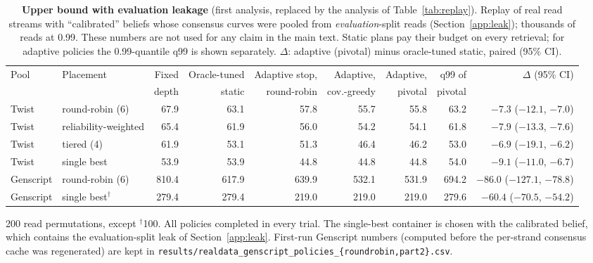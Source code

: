 \begin{table}[!t]
\centering
\caption{\textbf{Upper bound with evaluation leakage} (first analysis, replaced by the analysis of Table~\ref{tab:replay}).  Replay of real read streams with ``calibrated'' beliefs whose consensus curves were pooled from \emph{evaluation}-split reads (Section~\ref{app:leak}); thousands of reads at 0.99.  These numbers are not used for any claim in the main text.  Static plans pay their budget on every retrieval; for adaptive policies the 0.99-quantile q99 is shown separately.  $\Delta$: adaptive (pivotal) minus oracle-tuned static, paired (95\% CI).}
\label{tab:leak}
\footnotesize
\begin{tabular}{@{}llrrrrrrr@{}}
\toprule
Pool & Placement & Fixed & Oracle-tuned & Adaptive stop, & Adaptive, & Adaptive, & q99 of & $\Delta$ (95\% CI) \\
 & & depth & static & round-robin & cov.-greedy & pivotal & pivotal & \\
\midrule
Twist & round-robin (6) & 67.9 & 63.1 & 57.8 & 55.7 & 55.8 & 63.2 & $-7.3$ ($-12.1$, $-7.0$) \\
Twist & reliability-weighted & 65.4 & 61.9 & 56.0 & 54.2 & 54.1 & 61.8 & $-7.9$ ($-13.3$, $-7.6$) \\
Twist & tiered (4) & 61.9 & 53.1 & 51.3 & 46.4 & 46.2 & 53.0 & $-6.9$ ($-19.1$, $-6.2$) \\
Twist & single best & 53.9 & 53.9 & 44.8 & 44.8 & 44.8 & 54.0 & $-9.1$ ($-11.0$, $-6.7$) \\
Genscript & round-robin (6) & 810.4 & 617.9 & 639.9 & 532.1 & 531.9 & 694.2 & $-86.0$ ($-127.1$, $-78.8$) \\
Genscript & single best$^{\dagger}$ & 279.4 & 279.4 & 219.0 & 219.0 & 219.0 & 279.6 & $-60.4$ ($-70.5$, $-54.2$) \\
\bottomrule
\end{tabular}

\vspace{2pt}
\parbox{\textwidth}{\scriptsize 200 read permutations, except $^{\dagger}$100.  All policies completed in every trial.
The single-best container is chosen with the calibrated belief, which contains the evaluation-split leak of
Section~\ref{app:leak}.  First-run Genscript numbers (computed before the per-strand consensus cache was
regenerated) are kept in \texttt{results/realdata\_genscript\_policies\_\{roundrobin,part2\}.csv}.}
\end{table}
